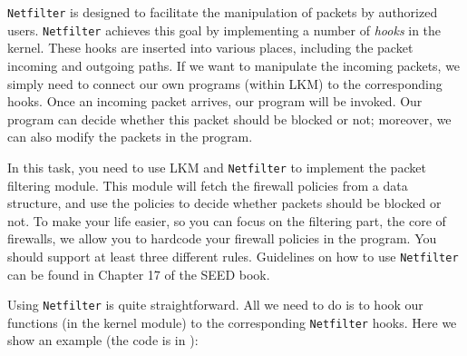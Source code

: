 {\tt Netfilter} is designed to facilitate the manipulation of 
packets by authorized users. {\tt Netfilter} achieves this 
goal by implementing a number of {\em hooks} in the 
\linux kernel. These hooks are inserted into various places, 
including the packet incoming and outgoing paths. 
If we want to manipulate the incoming packets, we simply
need to connect our own programs (within LKM) to the 
corresponding hooks. Once an incoming packet arrives, 
our program will be invoked. Our program can decide 
whether this packet should be blocked or not; moreover,
we can also modify the packets in the program.


In this task, you need to use LKM and {\tt Netfilter} to implement
the packet filtering module.  This module will fetch 
the firewall policies from a data structure, and use the 
policies to decide whether packets should be blocked or not.
To make your life easier, so you can focus on the filtering part, 
the core of firewalls, we allow you to hardcode your firewall policies 
in the program. You should support at least three different 
rules. Guidelines on how to use \texttt{Netfilter} can be 
found in Chapter 17 of the SEED book.


Using {\tt Netfilter} is quite straightforward. All we need to do
is to hook our functions (in the kernel module) to the corresponding
{\tt Netfilter} hooks. Here we show an example (the code is in
):


